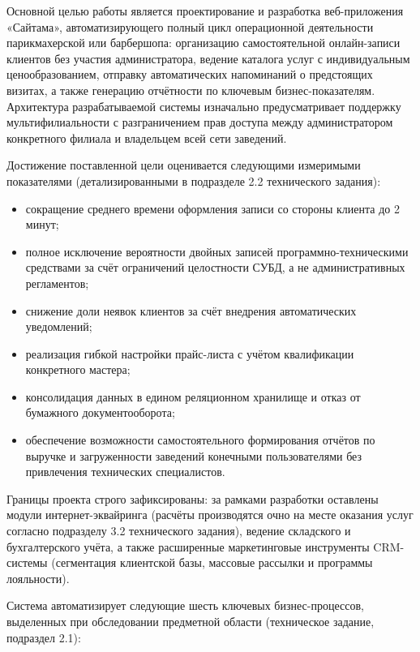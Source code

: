 Основной целью работы является проектирование и разработка веб-приложения
«Сайтама», автоматизирующего полный цикл операционной деятельности
парикмахерской или барбершопа: организацию самостоятельной онлайн-записи
клиентов без участия администратора, ведение каталога услуг с
индивидуальным ценообразованием, отправку автоматических напоминаний о
предстоящих визитах, а также генерацию отчётности по ключевым
бизнес-показателям. Архитектура разрабатываемой системы изначально
предусматривает поддержку мультифилиальности с разграничением прав
доступа между администратором конкретного филиала и владельцем всей сети
заведений.

Достижение поставленной цели оценивается следующими измеримыми
показателями (детализированными в подразделе 2.2 технического задания):

\begin{itemize}
  \item сокращение среднего времени оформления записи со стороны клиента
    до 2 минут;
  \item полное исключение вероятности двойных записей программно-техническими
    средствами за счёт ограничений целостности СУБД, а не административных
    регламентов;
  \item снижение доли неявок клиентов за счёт внедрения автоматических
    уведомлений;
  \item реализация гибкой настройки прайс-листа с учётом квалификации
    конкретного мастера;
  \item консолидация данных в едином реляционном хранилище и отказ от
    бумажного документооборота;
  \item обеспечение возможности самостоятельного формирования отчётов по
    выручке и загруженности заведений конечными пользователями без
    привлечения технических специалистов.
\end{itemize}

Границы проекта строго зафиксированы: за рамками разработки оставлены
модули интернет-эквайринга (расчёты производятся очно на месте оказания
услуг согласно подразделу 3.2 технического задания), ведение складского
и бухгалтерского учёта, а также расширенные маркетинговые инструменты CRM-системы
(сегментация клиентской базы, массовые рассылки и программы лояльности).


Система автоматизирует следующие шесть ключевых бизнес-процессов, выделенных
при обследовании предметной области (техническое задание, подраздел 2.1):

